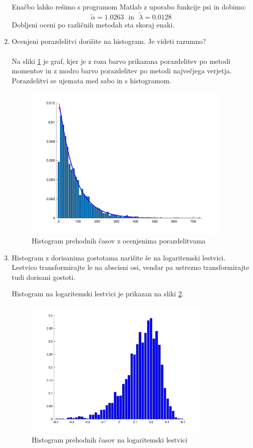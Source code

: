 \documentclass[a4paper]{article}
\begin{document}
\begin{enumerate}[label=(\alph*)]
Enačbo lahko rešimo s programom Matlab z uporabo funkcije psi in dobimo:
$$\tilde{\alpha} = 1.0263 \ \ \ \text{in} \ \ \ \tilde{\lambda} = 0.0128$$
Dobljeni oceni po različnih metodah sta skoraj enaki. 

\item Ocenjeni porazdelitvi dorišite na histogram. Je videti razumno? \\ \\
Na sliki \ref{fig:por} je graf, kjer je z roza barvo prikazana porazdelitev po metodi momentov in z modro barvo porazdelitev po metodi največjega verjetja. Porazdelitvi se ujemata med sabo in s histogramom.
\begin{figure}[h!]
\centering
\includegraphics[width=10cm]{histogram_porazdelitve3.png}
\caption{Histogram prehodnih časov z ocenjenima porazdelitvama}
\label{fig:por}
\end{figure}

\item Histogram z dorisanima gostotama narišite še na logaritemski lestvici. Lestvico transformirajte le na abscisni osi, vendar pa ustrezno transformirajte tudi dorisani gostoti.

Histogram na logaritemski lestvici je prikazan na sliki \ref{fig:log}.

\begin{figure}[h!]
\centering
\includegraphics[width=9cm]{log_histogram3.png}
\caption{Histogram prehodnih časov na logaritemski lestvici}
\label{fig:log}
\end{figure}


\end{enumerate}
\end{document}
